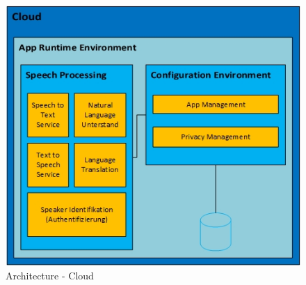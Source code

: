 \begin{figure}[h!]
	\centering
	\includegraphics[width=0.9\linewidth]{Picture/Infrastruktur-Cloud.jpg}
	\caption[Architecture - Cloud]{Architecture - Cloud}
	\label{fig:infrastructure-cloud}
\end{figure}

